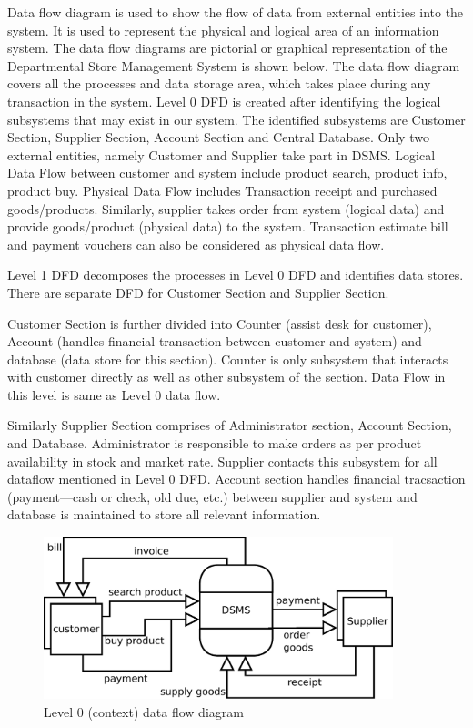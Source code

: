 Data flow diagram is used to show the flow of data from external entities into
the system. It is used to represent the physical and logical area of an
information system. The data flow diagrams are pictorial or graphical
representation of the Departmental Store Management System is shown below. The
data flow diagram covers all the processes and data storage area, which takes
place during any transaction in the system. Level 0 DFD is created after
identifying the logical subsystems that may exist in our system. The identified
subsystems are Customer Section, Supplier Section, Account Section and Central
Database. Only two external entities, namely Customer and Supplier take part in
DSMS. Logical Data Flow between customer and system include product search,
product info, product buy. Physical Data Flow includes Transaction receipt and
purchased goods/products. Similarly, supplier takes order from system (logical
data) and provide goods/product (physical data) to the system. Transaction
estimate bill and payment vouchers can also be considered as physical data
flow.

Level 1 DFD decomposes the processes in Level 0  DFD and identifies data
stores. There are separate DFD for Customer Section and Supplier Section. 

Customer Section is further divided into Counter (assist desk for customer),
Account (handles financial transaction between customer and system) and
database (data store for this section). Counter is only subsystem that
interacts with customer directly as well as other subsystem of the section.
Data Flow in this level is same as Level 0 data flow.

Similarly Supplier Section comprises of Administrator section, Account Section,
and Database. Administrator is responsible to make orders as per product
availability in stock and market rate. Supplier contacts this subsystem for all
dataflow mentioned in Level 0 DFD. Account section handles financial
tracsaction (payment---cash or check, old due, etc.) between supplier and system
and database is maintained to store all relevant information.

\begin{figure}[h]\centering
  \includegraphics[width=4in]{fig/dfd-0}
  \caption{Level 0 (context) data flow diagram}\label{fig:dfd-0}
\end{figure}


